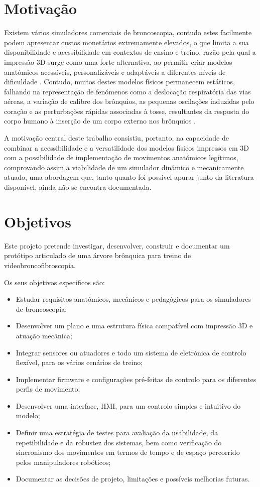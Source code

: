 \section{Motivação}
Existem vários simuladores comerciais de broncoscopia, contudo estes facilmente podem apresentar custos monetários extremamente elevados, o que limita a sua disponibilidade e acessibilidade em contextos de ensino e treino, razão pela qual a impressão 3D surge como uma forte alternativa, ao permitir criar modelos anatómicos acessíveis, personalizáveis e adaptáveis a diferentes níveis de dificuldade \parencite{Pedersen2017,Fu2023}. Contudo, muitos destes modelos físicos permanecem estáticos, falhando na representação de fenómenos como a deslocação respiratória das vias aéreas, a variação de calibre dos brônquios, as pequenas oscilações induzidas pelo coração e as perturbações rápidas associadas à tosse, resultantes da resposta do corpo humano à inserção de um corpo externo nos brônquios \parencite{Heinbecker1927,Ellis1936,Chen2015,Gunatilaka2020}.

A motivação central deste trabalho consistiu, portanto, na capacidade de combinar a acessibilidade e a versatilidade dos modelos físicos impressos em 3D com a possibilidade de implementação de movimentos anatómicos legítimos, comprovando assim a viabilidade de um simulador dinâmico e mecanicamente atuado, uma abordagem que, tanto quanto foi possível apurar junto da literatura disponível, ainda não se encontra documentada.

\section{Objetivos}
Este projeto pretende investigar, desenvolver, construir e documentar um protótipo articulado de uma árvore brônquica para treino de videobroncofibroscopia.

Os seus objetivos específicos são:
\begin{itemize}
  \item Estudar requisitos anatómicos, mecânicos e pedagógicos para os simuladores de broncoscopia;
  \item Desenvolver um plano e uma estrutura física compatível com impressão 3D e atuação mecânica;
  \item Integrar sensores ou atuadores e todo um sistema de eletrónica de controlo flexível, para os vários cenários de treino;
  \item Implementar firmware e configurações pré-feitas de controlo para os diferentes perfis de movimento;
  \item Desenvolver uma interface, HMI, para um controlo simples e intuitivo do modelo;
  \item Definir uma estratégia de testes para avaliação da usabilidade, da repetibilidade e da robustez dos sistemas, bem como verificação do sincronismo dos movimentos em termos de tempo e de espaço percorrido pelos manipuladores robóticos;
  \item Documentar as decisões de projeto, limitações e possíveis melhorias futuras.
\end{itemize}

